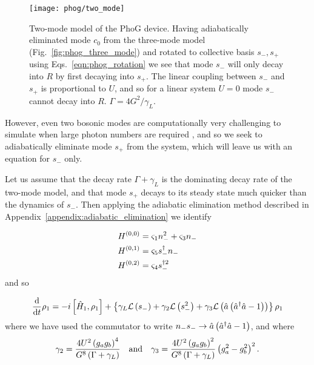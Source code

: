 \begin{figure}[htp]
\centering
\texttt{[image: phog/two\_mode]}
\caption{\label{fig:phog_two_mode_model} Two-mode model of the PhoG device. Having adiabatically eliminated mode $c_0$ from the three-mode model (Fig.~\ref{fig:phog_three_mode}) and rotated to collective basis $s_-, s_+$ using Eqs.~\ref{eqn:phog_rotation} we see that mode $s_-$ will only decay into $R$ by first decaying into $s_+$. The linear coupling between $s_-$ and $s_+$ is proportional to $U$, and so for a linear system $U=0$ mode $s_-$ cannot decay into $R$. $\Gamma = 4 G^2 / \gamma_L$.}
\end{figure}




However, even two bosonic modes are computationally very challenging to simulate when large photon numbers are required , and so we seek to adiabatically eliminate mode $s_+$ from the system, which will leave us with an equation for $s_-$ only. 

Let us assume that the decay rate $\Gamma + \gamma_L$ is the dominating decay rate of the two-mode model, and that mode $s_+$ decays to its steady state much quicker than the dynamics of $s_-$. Then applying the adiabatic elimination method described in Appendix~\ref{appendix:adiabatic_elimination} we identify

\begin{align}
H^{\left(0, 0\right)} &= \varsigma_1 n_-^2 + \varsigma_3 n_- \notag \\ 
%
H^{\left(0, 1\right)} &= \varsigma_5 s_-^\dagger n_- \notag \\
%
H^{\left(0, 2\right)} &= \varsigma_4 s_-^{\dagger 2}
\end{align}
and so

\begin{equation}\label{eqn:phog_single_mode_deriv}
\frac{\mathrm{d}}{\mathrm{d}t} \rho_1 = - i \left[\hat{H}_1, \rho_1\right] + \left\{\gamma_L \mathcal{L}\left(s_-\right) + \gamma_2 \mathcal{L}\left(s_-^2\right) + \gamma_3 \mathcal{L}\left(\hat{a}\left(\hat{a}^\dagger \hat{a} - 1\right)\right) \right\}\rho_1
\end{equation}
where we have used the commutator to write $n_- s_- \rightarrow \hat{a}\left(\hat{a}^\dagger \hat{a} - 1\right)$, and where
\begin{equation}
\gamma_2 = \frac{4 U^2 \left(g_a g_b\right)^4}{G^8 \left(\Gamma + \gamma_L\right)} \qq{and} \gamma_3 = \frac{4 U^2 \left(g_a g_b\right)^2}{G^8 \left(\Gamma + \gamma_L\right)}\left(g_a^2 - g_b^2\right)^2.
\end{equation}

